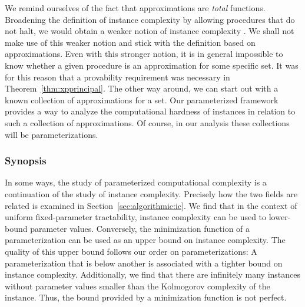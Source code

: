 We remind ourselves of the fact that approximations are \emph{total} functions.
Broadening the definition of instance complexity by allowing procedures that do not halt, we would obtain a weaker notion of instance complexity \parencite{kummer1996kolmogorov}.
We shall not make use of this weaker notion and stick with the definition based on approximations.
Even with this stronger notion, it is in general impossible to know whether a given procedure is an approximation for some specific set.
It was for this reason that a provability requirement was necessary in Theorem~\ref{thm:xpprincipal}.
The other way around, we can start out with a known collection of approximations for a set.
Our parameterized framework provides a way to analyze the computational hardness of instances in relation to such a collection of approximations.
Of course, in our analysis these collections will be parameterizations.

\subsubsection*{Synopsis}
In some ways, the study of parameterized computational complexity is a continuation of the study of instance complexity.
Precisely how the two fields are related is examined in Section~\ref{sec:algorithmic:ic}.
We find that in the context of uniform fixed-parameter tractability, instance complexity can be used to lower-bound parameter values.
Conversely, the minimization function of a parameterization can be used as an upper bound on instance complexity.
The quality of this upper bound follows our order on parameterizations:
A parameterization that is below another is associated with a tighter bound on instance complexity.
Additionally, we find that there are infinitely many instances without parameter values smaller than the Kolmogorov complexity of the instance.
Thus, the bound provided by a minimization function is not perfect.

